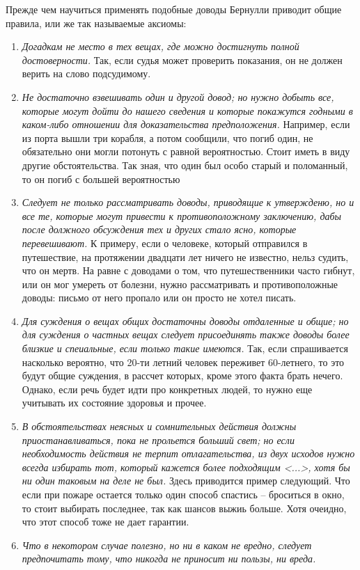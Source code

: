 \documentclass[12pt]{article}
\begin{document}
Прежде чем научиться применять подобные доводы Бернулли приводит общие правила, или же так называемые аксиомы:
\begin{enumerate}
	\item \textit{Догадкам не место в тех вещах, где можно достигнуть полной достоверности.}
	Так, если судья может проверить показания, он не должен верить на слово подсудимому.
	\item \textit{Не достаточно взвешивать один и другой довод; но нужно добыть все, которые могут дойти до нашего сведения и которые покажутся годными в каком-либо отношении для доказательства предположения.}
	Например, если из порта вышли три корабля, а потом сообщили, что погиб один, не обязательно они могли потонуть с равной вероятностью.
	Стоит иметь в виду другие обстоятельства.
	Так зная, что один был особо старый и поломанный, то он погиб с большей вероятностью	
	\item \textit{Следует не только рассматривать доводы, приводящие к утвержденю, но и все те, которые могут привести к противоположному заключению, дабы после должного обсуждения тех и других стало ясно, которые перевешивают.}
	К примеру, если о человеке, который отправился в путешествие, на протяжении двадцати лет ничего не известно, нельз судить, что он мертв. 
	На равне с доводами о том, что путешественники часто гибнут, или он мог умереть от болезни, нужно рассматривать и противоположные доводы: письмо от него пропало или он просто не хотел писать.
	\item \textit{Для суждения о вещах общих достаточны доводы отдаленные и общие; но для суждения о частных вещах следует присоединять также доводы более близкие и спеиальные, если только такие имеются.}
	Так, если спрашивается насколько вероятно, что 20-ти летний человек переживет 60-летнего, то это будут общие суждения, в рассчет которых, кроме этого факта брать нечего.
	Однако, если речь будет идти про конкретных людей, то нужно еще учитывать их состояние здоровья и прочее.
	\item \textit{В обстоятельствах неясных и сомнительных действия должны приостанавливаться, пока не прольется больший свет; но если необходимость действия не терпит отлагательства, из двух исходов нужно всегда избирать тот, который кажется более подходящим <...>, хотя бы ни один таковым на деле не был.}
	Здесь приводится пример следующий. Что если при пожаре остается только один способ спастись -- броситься в окно, то стоит выбирать последнее, так как шансов выжиь больше.
	Хотя очеидно, что этот способ тоже не дает гарантии.
	\item \textit{Что в некотором случае полезно, но ни в каком не вредно, следует предпочитать тому, что никогда не приносит ни пользы, ни вреда.}

\end{enumerate}
\end{document}
